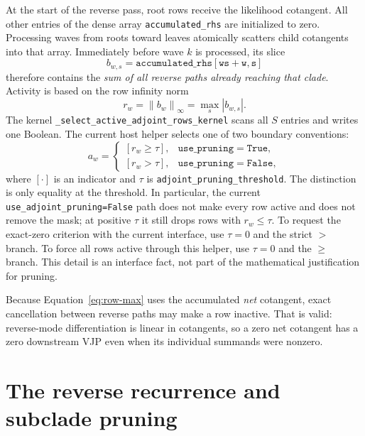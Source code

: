 \documentclass[11pt]{article}
\newcommand{\norm}[1]{\left\lVert #1\right\rVert}
\newcommand{\abs}[1]{\left\lvert #1\right\rvert}
\newcommand{\kernel}[1]{\nolinkurl{#1}}
\newcommand{\code}[1]{\nolinkurl{#1}}
\begin{document}
At the start of the reverse pass, root rows receive the likelihood cotangent.
All other entries of the dense array \code{accumulated\_rhs} are initialized to
zero.  Processing waves from roots toward leaves atomically scatters child
cotangents into that array.  Immediately before wave $k$ is processed, its
slice
\begin{equation}
  b_{w,s}=\mathtt{accumulated\_rhs[ws+w,s]}
  \label{eq:rhs}
\end{equation}
therefore contains the \emph{sum of all reverse paths already reaching that
clade}.  Activity is based on the row infinity norm
\begin{equation}
  r_w=\norm{b_w}_\infty=\max_s\abs{b_{w,s}}.
  \label{eq:row-max}
\end{equation}
The kernel \kernel{_select_active_adjoint_rows_kernel} scans all $S$ entries
and writes one Boolean.  The current host helper selects one of two boundary
conventions:
\begin{equation}
  a_w =
  \begin{cases}
    [r_w\ge \tau], & \mathtt{use\_pruning=True},\\
    [r_w>\tau], & \mathtt{use\_pruning=False},
  \end{cases}
  \label{eq:actual-mask}
\end{equation}
where $[\cdot]$ is an indicator and $\tau$ is
\code{adjoint\_pruning\_threshold}.  The distinction is only equality at the
threshold.  In particular, the current \code{use\_adjoint\_pruning=False}
path does not make every row active and does not remove the mask; at positive
$\tau$ it still drops rows with $r_w\le\tau$.  To request the exact-zero
criterion with the current interface, use $\tau=0$ and the strict $>$ branch.
To force all rows active through this helper, use $\tau=0$ and the $\ge$
branch.  This detail is an interface fact, not part of the mathematical
justification for pruning.

Because Equation~\eqref{eq:row-max} uses the accumulated \emph{net}
cotangent, exact cancellation between reverse paths may make a row inactive.
That is valid: reverse-mode differentiation is linear in cotangents, so a zero
net cotangent has a zero downstream VJP even when its individual summands were
nonzero.

\section{The reverse recurrence and subclade pruning}
\end{document}
